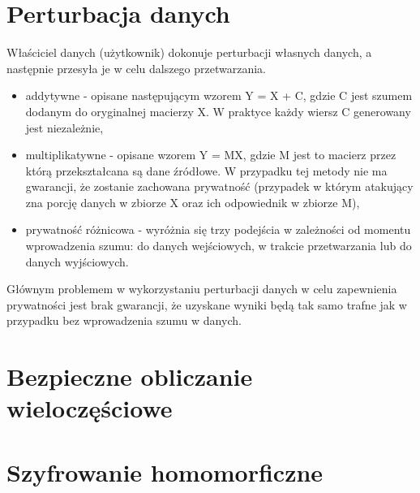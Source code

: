 \section{Perturbacja danych}
Właściciel danych (użytkownik) dokonuje perturbacji własnych danych, a następnie przesyła je w celu dalszego przetwarzania.
\begin{itemize}
    \item addytywne - opisane następującym wzorem 
    Y = X + C, gdzie C jest szumem dodanym do oryginalnej macierzy X. W praktyce każdy wiersz C generowany jest niezależnie,
    \item multiplikatywne - opisane wzorem Y = MX, gdzie M jest to macierz przez którą przekształcana są dane źródłowe. W przypadku tej metody nie ma gwarancji, że zostanie zachowana prywatność (przypadek w którym atakujący zna porcję danych w zbiorze X oraz ich odpowiednik w zbiorze M),
    \item prywatność różnicowa - wyróżnia się trzy podejścia w zależności od momentu wprowadzenia szumu: do danych wejściowych, w trakcie przetwarzania lub do danych wyjściowych.
\end{itemize}

Głównym problemem w wykorzystaniu perturbacji danych w celu zapewnienia prywatności jest brak gwarancji, że uzyskane wyniki będą tak samo trafne jak w przypadku bez wprowadzenia szumu w danych.
\section{Bezpieczne obliczanie wieloczęściowe}

\section{Szyfrowanie homomorficzne}

